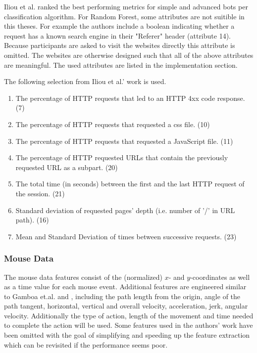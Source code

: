\documentclass[
    fontsize=12pt,
    headings=small,
    parskip=half,           %
    bibliography=totoc,
    numbers=noenddot,       %
    open=any,               %
    final,                   %
    table
]{scrreprt}
\begin{document}
Iliou et al. \cite{10.1145/3339252.3339267} ranked the best performing metrics for simple and advanced bots per classification algorithm. For Random Forest, some attributes are not suitible in this theses. For example the authors include a boolean indicating whether a request has a known search engine in their "Referer" header (attribute 14). Because participants are asked to visit the websites directly this attribute is omitted. The websites are otherwise designed such that all of the above attributes are meaningful. The used attributes are listed in the implementation section.

The following selection from Iliou et al.' work \cite{10.1145/3339252.3339267} is used.

\begin{enumerate}
    \item The percentage of HTTP requests that led to an HTTP 4xx code response. (7)
    \item The percentage of HTTP requests that requested a css file. (10)
    \item The percentage of HTTP requests that requested a JavaScript file. (11)
    \item The percentage of HTTP requested URLs that contain the previously requested URL as a subpart. (20)
    \item The total time (in seconds) between the first and the last HTTP request of the session. (21)
    \item Standard deviation of requested pages' depth (i.e. number of ’/’ in URL path). (16)
    \item Mean and Standard Deviation of times between successive requests. (23)
\end{enumerate}

\label{concept_mouse_data}
\subsubsection{Mouse Data}

The mouse data features consist of the (normalized) $x$- and $y$-coordinates as well as a time value for each mouse event. Additional features are engineered similar to Gamboa et.al.\cite{GAMBOA2004} and \cite{https://doi.org/10.1049/iet-bmt.2018.5126}, including the path length from the origin, angle of the path tangent, horizontal, vertical and overall velocity, acceleration, jerk, angular velocity. Additionally the type of action, length of the movement and time needed to complete the action will be used. Some features used in the authors' work have been omitted with the goal of simplifying and speeding up the feature extraction which can be revisited if the performance seems poor.
\end{document}
